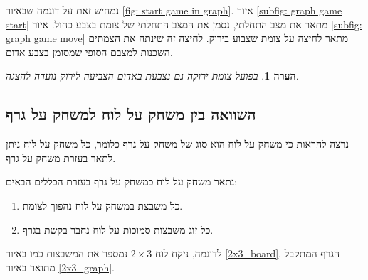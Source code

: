 \documentclass[12pt,leqno]{article}
\theoremstyle{theoremdd}
\newtheorem{comm}{הערה}[section]
\begin{document}
נמחיש זאת על דוגמה שבאיור
\ref{fig: start game in graph}.
איור 
\ref{subfig: graph game start}
מתאר את מצב התחלתי, נסמן את המצב התחלתי של צומת בצבע כחול.
איור
\ref{subfig: graph game move}
מתאר לחיצה על צומת שצבוע בירוק.
לחיצה זה שינתה את הצמתים השכנות למצבם הסופי שמסומן בצבע אדום.
\begin{comm}
    בפועל צומת ירוקה גם נצבעת באדום הצביעה לירוק נועדה להצגה.
\end{comm}

\subsection{השוואה בין משחק על לוח למשחק על גרף}
נרצה להראות כי משחק על לוח הוא סוג של משחק על גרף
כלומר, כל משחק על לוח ניתן לתאר בעזרת משחק על גרף.

נתאר משחק על לוח כמשחק על גרף בעזרת הכללים הבאים:
\begin{enumerate}
    \item 
    כל משבצת במשחק על לוח נהפוך לצומת.
    \item 
    כל זוג משבצות סמוכות על לוח נחבר בקשת בגרף.
\end{enumerate}

לדוגמה, ניקח לוח
$2 \times 3$
נמספר את המשבצות כמו באיור
\ref{2x3_board}.
הגרף המתקבל מתואר באיור
\ref{2x3_graph}.
\end{document}
